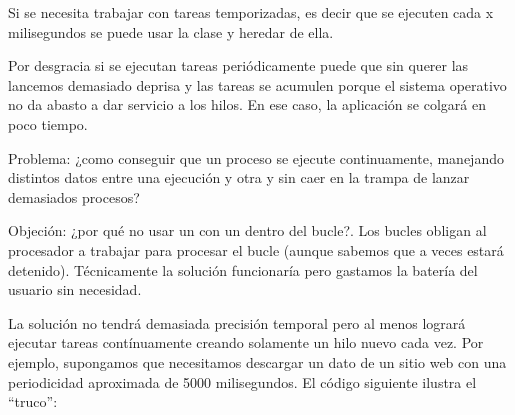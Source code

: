 \documentclass[a4paper,12pt,spanish]{sphinxmanual}
\begin{document}
Si se necesita trabajar con tareas temporizadas, es decir que se ejecuten cada x milisegundos se puede usar la clase  y heredar de ella.

Por desgracia si se ejecutan tareas periódicamente puede que sin querer las lancemos demasiado deprisa y las tareas se acumulen porque el sistema operativo no da abasto a dar servicio a los hilos. En ese caso, la aplicación se colgará en poco tiempo.

Problema: ¿como conseguir que un proceso se ejecute continuamente, manejando distintos datos entre una ejecución y otra y sin caer en la trampa de lanzar demasiados procesos?

Objeción: ¿por qué no usar un  con un  dentro del bucle?. Los bucles  obligan al procesador a trabajar para procesar el bucle (aunque sabemos que a veces estará detenido). Técnicamente la solución funcionaría pero gastamos la batería del usuario sin necesidad.

La solución no tendrá demasiada precisión temporal pero al menos logrará ejecutar tareas contínuamente creando solamente un hilo nuevo cada vez. Por ejemplo, supongamos que necesitamos descargar un dato de un sitio web con una periodicidad aproximada de 5000 milisegundos. El código siguiente ilustra el ``truco'':
\end{document}
